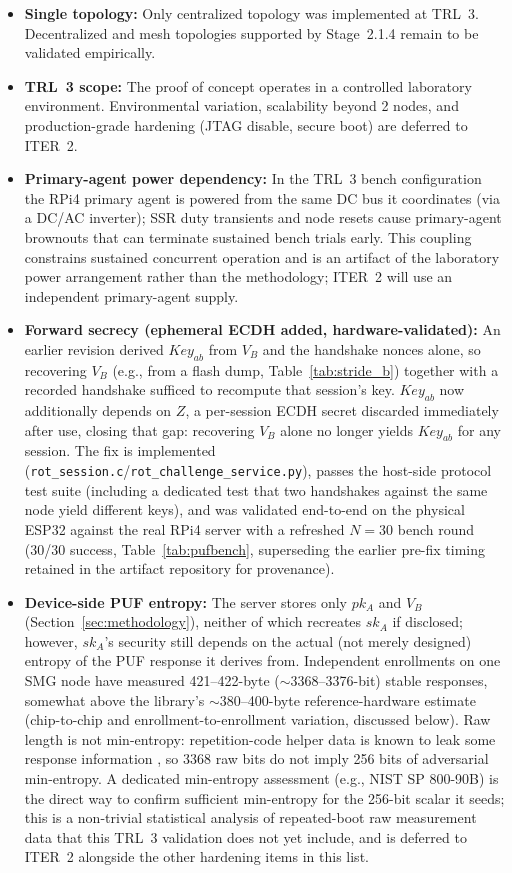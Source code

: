 \documentclass[preprint,12pt,authoryear]{elsarticle}
\begin{document}
\begin{sloppypar}
\begin{itemize}[leftmargin=*]
    \item \textbf{Single topology:} Only centralized topology was implemented at TRL~3. Decentralized and mesh topologies supported by Stage~2.1.4 remain to be validated empirically.
    \item \textbf{TRL~3 scope:} The proof of concept operates in a controlled laboratory environment. Environmental variation, scalability beyond 2 nodes, and production-grade hardening (JTAG disable, secure boot) are deferred to ITER~2.
    \item \textbf{Primary-agent power dependency:} In the TRL~3 bench configuration the RPi4 primary agent is powered from the same DC bus it coordinates (via a DC/AC inverter); SSR duty transients and node resets cause primary-agent brownouts that can terminate sustained bench trials early. This coupling constrains sustained concurrent operation and is an artifact of the laboratory power arrangement rather than the methodology; ITER~2 will use an independent primary-agent supply.
    \item \textbf{Forward secrecy (ephemeral ECDH added, hardware-validated):} An earlier revision derived $Key_{ab}$ from $V_B$ and the handshake nonces alone, so recovering $V_B$ (e.g., from a flash dump, Table~\ref{tab:stride_b}) together with a recorded handshake sufficed to recompute that session's key. $Key_{ab}$ now additionally depends on $Z$, a per-session ECDH secret discarded immediately after use, closing that gap: recovering $V_B$ alone no longer yields $Key_{ab}$ for any session. The fix is implemented (\texttt{rot\_session.c}/\allowbreak\texttt{rot\_challenge\_\allowbreak service.py}), passes the host-side protocol test suite (including a dedicated test that two handshakes against the same node yield different keys), and was validated end-to-end on the physical ESP32 against the real RPi4 server with a refreshed $N=30$ bench round (30/30 success, Table~\ref{tab:pufbench}, superseding the earlier pre-fix timing retained in the artifact repository for provenance).
    \item \textbf{Device-side PUF entropy:} The server stores only $pk_A$ and $V_B$ (Section~\ref{sec:methodology}), neither of which recreates $sk_A$ if disclosed; however, $sk_A$'s security still depends on the actual (not merely designed) entropy of the PUF response it derives from. Independent enrollments on one SMG node have measured 421--422-byte ($\sim$3368--3376-bit) stable responses, somewhat above the library's $\sim$380--400-byte reference-hardware estimate (chip-to-chip and enrollment-to-enrollment variation, discussed below). Raw length is not min-entropy: repetition-code helper data is known to leak some response information \citep{dodis2004fuzzy, maes2013physically, delvaux2015helper}, so 3368 raw bits do not imply 256 bits of adversarial min-entropy. A dedicated min-entropy assessment (e.g., NIST SP 800-90B) is the direct way to confirm sufficient min-entropy for the 256-bit scalar it seeds; this is a non-trivial statistical analysis of repeated-boot raw measurement data that this TRL~3 validation does not yet include, and is deferred to ITER~2 alongside the other hardening items in this list.

\end{itemize}
\end{sloppypar}
\end{document}
